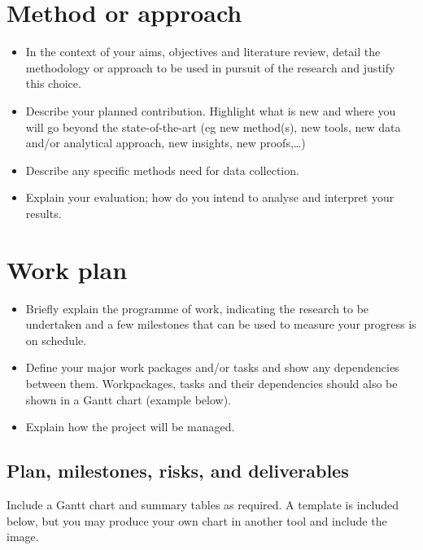\documentclass[11pt]{ipp}
\begin{document}
\section{Method or approach}%
\label{sec:method}

\begin{itemize}[nosep]
    \item In the context of your aims, objectives and literature review, detail the methodology or approach to be used in pursuit of the research and justify this choice. 
    \item Describe your planned contribution. Highlight what is new and where you will go beyond the state-of-the-art (eg new method(s), new tools,
    new data and/or analytical approach, new insights, new proofs,\ldots)
    \item Describe any specific methods need for data collection.
    \item Explain your evaluation; how do you intend to analyse and interpret your results.
\end{itemize}



\section{Work plan}%
\label{sec:workplan}

\begin{itemize}[nosep]
    \item Briefly explain the programme of work, indicating the research to be undertaken and a few milestones that can be used to measure your progress is on schedule.
    \item Define your major work packages and/or tasks and show any  dependencies between them. Workpackages, tasks and their dependencies should also be shown in a Gantt chart (example below).
    \item Explain how the project will be managed.
\end{itemize}

\subsection{Plan, milestones, risks, and deliverables}%
\label{sec:plan}

Include a Gantt chart and summary tables as required. A template is included below, but you may produce your own chart in another tool and include the image.
\end{document}

